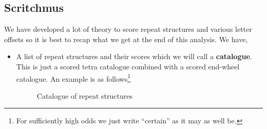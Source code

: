 \subsection{Scritchmus}
We have developed a lot of theory to score repeat structures and
various letter offsets so it is best to recap what we get at the
end of this analysis. We have,
\begin{itemize}
  \item A list of repeat structures and their scores which we will
    call a {\bf{catalogue}}. This is just a scored tetra catalogue
    combined with a scored end-wheel catalogue. An example is as
    follows\footnote{For sufficiently high odds we just write
    ``certain'' as it may as well be.}
    \begin{figure}[H]

      \begin{center}
      \end{center}
      \caption{Catalogue of repeat structures~\cite[p.~99]{Alexander1945}}
      \label{fig:catalogue}
    \end{figure}

\end{itemize}
